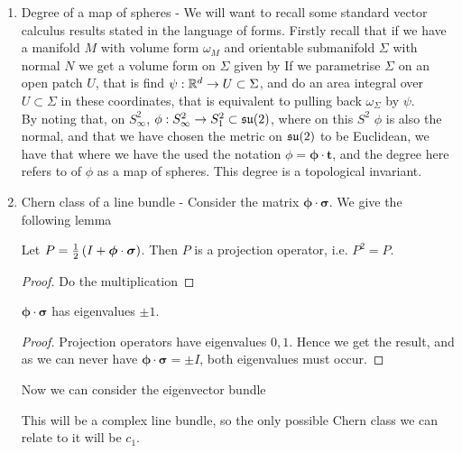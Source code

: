 \documentclass{article}
\begin{document}
\begin{enumerate}
	\item Degree of a map of spheres - We will want to recall some standard vector calculus results stated in the language of forms. Firstly recall that if we have a manifold $M$ with volume form $\omega_M$ and orientable submanifold $\Sigma$ with normal $N$ we get a volume form on $\Sigma$ given by 
If we parametrise $\Sigma$ on an open patch $U$, that is find $\psi:\mathbb{R}^d \to U \subset \Sigma$, and do an area integral over $U \subset \Sigma$ in these coordinates, that is equivalent to pulling back $\omega_\Sigma$ by $\psi$. \\
By noting that, on $S_\infty^2$, $\phi:S_\infty^2 \to S_1^2 \subset \mathfrak{su}(2)$, where on this $S^2$ $\phi$ is also the normal, and that we have chosen the metric on $\mathfrak{su}(2)$ to be Euclidean, we have that 
where we have the used the notation $\phi = \bm{\phi} \cdot \bm{t}$, and the degree here refers to of $\phi$ as a map of spheres. This degree is a topological invariant.
\item Chern class of a line bundle - Consider the matrix $\bm{\phi} \cdot \bm{\sigma}$. We give the following lemma
\begin{lemma}
	Let $P = \frac{1}{2}\left( I + \bm{\phi} \cdot \bm{\sigma} \right)$. Then $P$ is a projection operator, i.e. $P^2=P$. 
\end{lemma}
\begin{proof}
	Do the multiplication
\end{proof}
\begin{corollary}
	$\bm{\phi} \cdot\bm{\sigma}$ has eigenvalues $\pm 1$. 
\end{corollary}
\begin{proof}
	Projection operators have eigenvalues $0,1$. Hence we get the result, and as we can never have $\bm{\phi} \cdot\bm{\sigma} = \pm I$, both eigenvalues must occur. 
\end{proof}
Now we can consider the eigenvector bundle 
\begin{remark}
	This will be a complex line bundle, so the only possible Chern class we can relate to it will be $c_1$. 
\end{remark}

\end{enumerate}
\end{document}
